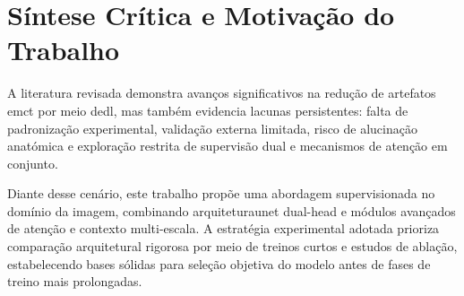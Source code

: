 \section{Síntese Crítica e Motivação do Trabalho}

A literatura revisada demonstra avanços significativos na redução de artefatos em\acrshort{ct} por meio de\acrshort{dl}, mas também evidencia lacunas persistentes: falta de padronização experimental, validação externa limitada, risco de alucinação anatómica e exploração restrita de supervisão dual e mecanismos de atenção em conjunto.

Diante desse cenário, este trabalho propõe uma abordagem supervisionada no domínio da imagem, combinando arquitetura\acrshort{unet} dual-head e módulos avançados de atenção e contexto multi-escala. A estratégia experimental adotada prioriza comparação arquitetural rigorosa por meio de treinos curtos e estudos de ablação, estabelecendo bases sólidas para seleção objetiva do modelo antes de fases de treino mais prolongadas.